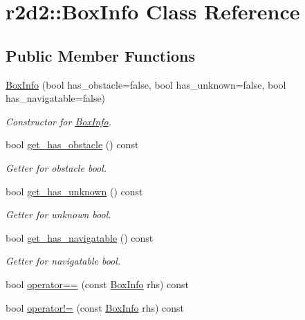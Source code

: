 \hypertarget{classr2d2_1_1_box_info}{}\section{r2d2\+:\+:Box\+Info Class Reference}
\label{classr2d2_1_1_box_info}
\subsection*{Public Member Functions}
\begin{DoxyCompactItemize}
\item 
\hyperlink{classr2d2_1_1_box_info_aecb228ad1f7d71ef89b22eaf9fb91353}{Box\+Info} (bool has\+\_\+obstacle=false, bool has\+\_\+unknown=false, bool has\+\_\+navigatable=false)
\begin{DoxyCompactList}\small\item\em Constructor for \hyperlink{classr2d2_1_1_box_info}{Box\+Info}. \end{DoxyCompactList}\item 
bool \hyperlink{classr2d2_1_1_box_info_a1acf6db4b90ea6a7cb405ab2dfe1237e}{get\+\_\+has\+\_\+obstacle} () const 
\begin{DoxyCompactList}\small\item\em Getter for obstacle bool. \end{DoxyCompactList}\item 
bool \hyperlink{classr2d2_1_1_box_info_a3a7e5f644442d123f2e07651442bc8d6}{get\+\_\+has\+\_\+unknown} () const 
\begin{DoxyCompactList}\small\item\em Getter for unknown bool. \end{DoxyCompactList}\item 
bool \hyperlink{classr2d2_1_1_box_info_ac7793568145b5e3931e2061bb4fb2f1a}{get\+\_\+has\+\_\+navigatable} () const 
\begin{DoxyCompactList}\small\item\em Getter for navigatable bool. \end{DoxyCompactList}\item 
bool \hyperlink{classr2d2_1_1_box_info_acfea2fcf06c42d765fe7fc6048101782}{operator==} (const \hyperlink{classr2d2_1_1_box_info}{Box\+Info} rhs) const 
\item 
bool \hyperlink{classr2d2_1_1_box_info_aa6021b526eb5e161f56bc6cfbf031f89}{operator!=} (const \hyperlink{classr2d2_1_1_box_info}{Box\+Info} rhs) const 
\end{DoxyCompactItemize}


